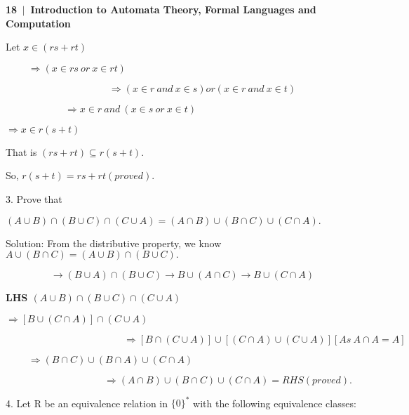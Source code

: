 \documentclass[10pt,a4paper]{book}
\begin{document}
\scriptsize

\begin{flushleft}
\textsf{\textbf{  18\, $|$ \,Introduction to Automata Theory, Formal Languages and Computation}}
\end{flushleft}

Let $x \in (rs + rt)$

\begin{center}
  $\qquad\;\Longrightarrow (x \in rs \:or\: x \in rt)$

  $\qquad\qquad\qquad\qquad\qquad\:\;\Longrightarrow (x \in r \:and\: x \in s) or (x \in r \:and\: x \in t)$

  $\qquad\qquad\qquad\Longrightarrow x \in r \:and\: (x \in s \:or\: x \in t)$

  $\Longrightarrow x \in r(s + t)$
\end{center}

That is $(rs + rt) \subseteq r(s + t)$.

\qquad So, $r(s + t) = rs + rt (proved)$.

\begin{flushleft}
3. Prove that
\end{flushleft}

$(A \cup B) \cap (B \cup C) \cap (C \cup A) = (A \cap B) \cup (B \cap C) \cup (C \cap A).$

Solution: From the distributive property, we know $A \cup (B \cap C) = (A \cup B) \cap (B \cup C).$

$$\longrightarrow (B \cup A) \cap (B \cup C) \rightarrow B \cup (A \cap C) \rightarrow B \cup (C \cap A)$$

\textbf{LHS $(A \cup B) \cap (B \cup C) \cap (C \cup A)$}

\begin{center}
  $\Longrightarrow [B \cup (C \cap A)] \cap (C \cup A)$

  $\qquad\qquad\qquad\qquad\qquad\qquad\Longrightarrow [B \cap (C \cup A)] \cup [(C \cap A) \cup(C \cup A)] [As\: A \cap A = A]$

  $\qquad\;\Longrightarrow (B \cap C) \cup(B \cap A) \cup (C \cap A)$

  $\qquad\qquad\qquad\qquad\qquad\Longrightarrow (A \cap B) \cup (B \cap C) \cup (C \cap A) = RHS (proved).$
\end{center}

\begin{flushleft}
  4. Let R be an equivalence relation in $\{0\}^{*}$ with the following equivalence classes:
\end{flushleft}
\end{document}
